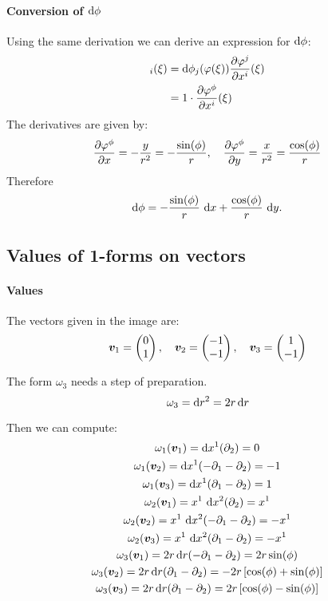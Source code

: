 \documentclass[11pt, english, fleqn, DIV=15, headinclude, BCOR=1cm]{scrartcl}
\begin{document}
\paragraph{Conversion of $\mathop{}\!\mathrm d \phi$}

Using the same derivation we can derive an expression for $\mathop{}\!\mathrm d \phi$:
\begin{align*}
    [\varphi^* \dif \phi]_i(\xi)
    &= \dif \phi_j(\varphi(\xi)) \pd{\varphi^j}{x^i}(\xi) \\
    &= 1 \cdot \pd{\varphi^\phi}{x^i}(\xi)
\end{align*}
The derivatives are given by:
\[
    \frac{\partial {\varphi^\phi}}{\partial {x}} = - \frac{y}{r^2} = - \frac{\sin(\phi)}r
    ,\quad
    \frac{\partial {\varphi^\phi}}{\partial {y}} = \frac{x}{r^2} = \frac{\cos(\phi)}r
\]
Therefore
\[
    \mathop{}\!\mathrm d \phi = - \frac{\sin(\phi)}r \, \mathop{}\!\mathrm d x + \frac{\cos(\phi)}r \, \mathop{}\!\mathrm d y.
\]

\subsection{Values of 1-forms on vectors}

\paragraph{Values}

The vectors given in the image are:
\[
    \boldsymbol{v}_1 = \begin{pmatrix} 0 \\ 1 \end{pmatrix}
    ,\quad
    \boldsymbol{v}_2 = \begin{pmatrix} -1 \\ -1 \end{pmatrix}
    ,\quad
    \boldsymbol{v}_3 = \begin{pmatrix} 1 \\ -1 \end{pmatrix}
\]

The form $\omega_3$ needs a step of preparation.
\[
    \omega_3 = \mathop{}\!\mathrm d r^2 = 2 r \mathop{}\!\mathrm d r
\]

Then we can compute:
\begin{gather*}
    \omega_1(\vec v_1) = \dif x^1 (\partial_2) = 0 \\
    \omega_1(\vec v_2) = \dif x^1 (-\partial_1-\partial_2) = -1 \\
    \omega_1(\vec v_3) = \dif x^1 (\partial_1-\partial_2) = 1 \\
    \omega_2(\vec v_1) = x^1 \, \dif x^2 (\partial_2) = x^1 \\
    \omega_2(\vec v_2) = x^1 \, \dif x^2 (-\partial_1-\partial_2) = -x^1 \\
    \omega_2(\vec v_3) = x^1 \, \dif x^2 (\partial_1-\partial_2) = - x^1  \\
    \omega_3(\vec v_1) = 2 r \dif r (-\partial_1-\partial_2) = 2 r \sin(\phi) \\
    \omega_3(\vec v_2) = 2 r \dif r (\partial_1-\partial_2) = - 2 r
    \sbr{\cos(\phi) + \sin(\phi)} \\
    \omega_3(\vec v_3) = 2 r \dif r (\partial_1-\partial_2) = 2 r
    \sbr{\cos(\phi) - \sin(\phi)}
\end{gather*}
\end{document}
